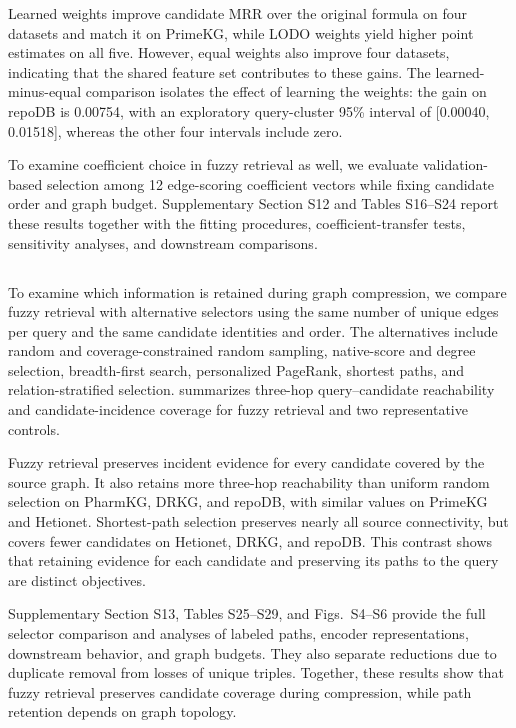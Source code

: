 \begin{revisionblock}

Learned weights improve candidate MRR over the original formula on four datasets and match it on PrimeKG, while LODO weights yield higher point estimates on all five. However, equal weights also improve four datasets, indicating that the shared feature set contributes to these gains. The learned-minus-equal comparison isolates the effect of learning the weights: the gain on repoDB is 0.00754, with an exploratory query-cluster 95\% interval of [0.00040, 0.01518], whereas the other four intervals include zero.

To examine coefficient choice in fuzzy retrieval as well, we evaluate validation-based selection among 12 edge-scoring coefficient vectors while fixing candidate order and graph budget. Supplementary Section S12 and Tables S16--S24 report these results together with the fitting procedures, coefficient-transfer tests, sensitivity analyses, and downstream comparisons.
\end{revisionblock}

\subsection{}
\label{sec:retention_results}
\begin{revisionblock}
To examine which information is retained during graph compression, we compare fuzzy retrieval with alternative selectors using the same number of unique edges per query and the same candidate identities and order. The alternatives include random and coverage-constrained random sampling, native-score and degree selection, breadth-first search, personalized PageRank, shortest paths, and relation-stratified selection.  summarizes three-hop query--candidate reachability and candidate-incidence coverage for fuzzy retrieval and two representative controls.

Fuzzy retrieval preserves incident evidence for every candidate covered by the source graph. It also retains more three-hop reachability than uniform random selection on PharmKG, DRKG, and repoDB, with similar values on PrimeKG and Hetionet. Shortest-path selection preserves nearly all source connectivity, but covers fewer candidates on Hetionet, DRKG, and repoDB. This contrast shows that retaining evidence for each candidate and preserving its paths to the query are distinct objectives.

Supplementary Section S13, Tables S25--S29, and Figs.~S4--S6 provide the full selector comparison and analyses of labeled paths, encoder representations, downstream behavior, and graph budgets. They also separate reductions due to duplicate removal from losses of unique triples. Together, these results show that fuzzy retrieval preserves candidate coverage during compression, while path retention depends on graph topology.
\end{revisionblock}
